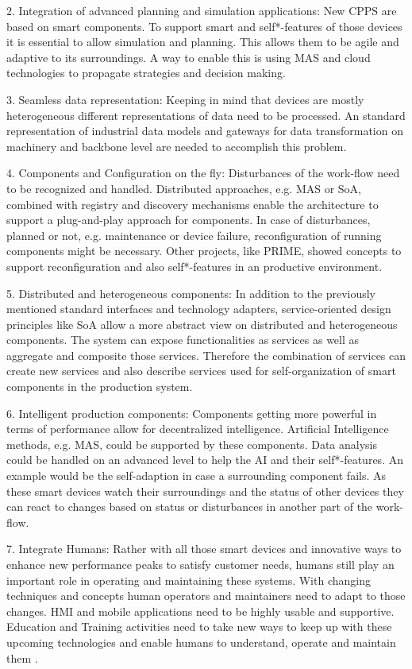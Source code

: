 \documentclass[conference,compsoc,hidelinks]{IEEEtran}
\begin{document}
2. Integration of advanced planning and simulation applications: New CPPS are based on smart components. To support smart and self*-features of those devices it is essential to allow simulation and planning. This allows them to be agile and adaptive to its surroundings. A way to enable this is using MAS and cloud technologies to propagate strategies and decision making.

3. Seamless data representation: Keeping in mind that devices are mostly heterogeneous different representations of data need to be processed. An standard representation of industrial data models and gateways for data transformation on machinery and backbone level are needed to accomplish this problem.

4. Components and Configuration on the fly: Disturbances of the work-flow need to be recognized and handled. Distributed approaches, e.g. MAS or SoA, combined with registry and discovery mechanisms enable the architecture to support a plug-and-play approach for components. In case of disturbances, planned or not, e.g. maintenance or device failure, reconfiguration of running components might be necessary. Other projects, like PRIME, showed concepts to support reconfiguration and also self*-features in an productive environment.

5. Distributed and heterogeneous components: In addition to the previously mentioned standard interfaces and technology adapters, service-oriented design principles like SoA allow a more abstract view on distributed and heterogeneous components. The system can expose functionalities as services as well as aggregate and composite those services. Therefore the combination of services can create new services and also describe services used for self-organization of smart components in the production system.

6. Intelligent production components: Components getting more powerful in terms of performance allow for decentralized intelligence. Artificial Intelligence methods, e.g. MAS, could be supported by these components. Data analysis could be handled on an advanced level to help the AI and their self*-features. An example would be the self-adaption in case a surrounding component fails. As these smart devices watch their surroundings and the status of other devices they can react to changes based on status or disturbances in another part of the work-flow.

7. Integrate Humans: Rather with all those smart devices and innovative ways to enhance new performance peaks to satisfy customer needs, humans still play an important role in operating and maintaining these systems. With changing techniques and concepts human operators and maintainers need to adapt to those changes. HMI and mobile applications need to be highly usable and supportive. Education and Training activities need to take new ways to keep up with these upcoming technologies and enable humans to understand, operate and maintain them \cite{SpecPERFoRM}.
\end{document}
